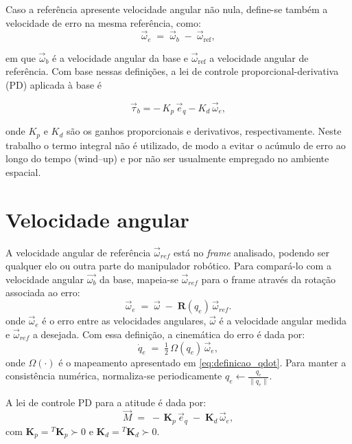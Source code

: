 Caso a referência apresente velocidade angular não nula, define-se também a velocidade de erro na mesma referência, como:
\begin{equation}
    \vec{\omega}_e \;=\; \vec{\omega}_b \;-\; \vec{\omega}_{\mathrm{ref}},
    \label{eq:erro_velocidade}
\end{equation}

em que $\vec{\omega}_b$ é a velocidade angular da base e $\vec{\omega}_{\mathrm{ref}}$ a velocidade angular de referência.
Com base nessas definições, a lei de controle proporcional-derivativa (PD) aplicada à base é

\begin{equation}
    \vec{\tau}_b=
    -\,K_p\,\vec e_q
    -K_d\,\vec\omega_e,
    \label{eq:lei_controle_PD}
\end{equation}

onde $K_p$ e $K_d$ são os ganhos proporcionais e derivativos, respectivamente. 
Neste trabalho o termo integral não é utilizado, de modo a evitar o acúmulo de erro ao longo do tempo (wind--up) 
e por não ser usualmente empregado no ambiente espacial.




\section{Velocidade angular}
A velocidade angular de referência $\vec \omega_{ref}$ está no \emph{frame} analisado, podendo ser qualquer elo ou outra parte do manipulador robótico.
Para compará-lo com a velocidade angular $\vec{\omega_b}$ da base, mapeia-se $\vec{\omega}_{ref}$ para o frame através da rotação associada ao erro:
\begin{equation}
\vec{\omega}_e \;=\; \vec{\omega} \;-\; \mathbf{R}(q_e)\,\vec{\omega}_{ref}.
\label{eq:omega_e}
\end{equation}
onde $\vec \omega_e$ é o erro entre as velocidades angulares, $\vec \omega$ é a velocidade angular medida e
$\vec \omega_{ref}$ a desejada.
Com essa definição, a cinemática do erro é dada por:
\begin{equation}
\dot{q}_e \;=\; \tfrac{1}{2}\,\Omega(q_e)\,\vec{\omega}_e,
\label{eq:qedot}
\end{equation}
onde $\Omega(\cdot)$ é o mapeamento apresentado em \eqref{eq:definicao_qdot}.
Para manter a consistência numérica, normaliza-se periodicamente $q_e \leftarrow \frac{q_e}{\|q_e\|}$.

A lei de controle PD para a atitude é dada por:
\begin{equation}
\vec{M} \;=\; -\,\mathbf{K}_p\,\vec{e}_q \;-\; \mathbf{K}_d\,\vec{\omega}_e,
\label{eq:controle_PD_fundamental}
\end{equation}
com $\mathbf{K}_p={}^T\mathbf{K}_p \succ 0$ e $\mathbf{K}_d={}^T\mathbf{K}_d \succ 0$.

